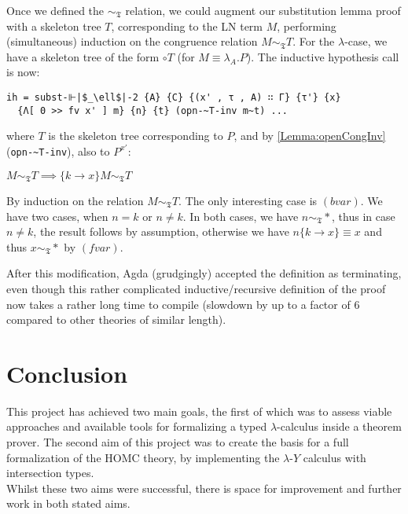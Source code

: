\documentclass[a4paper, 12pt, twoside]{style/ociamthesis}
\makeatletter
\theoremstyle{plain}
\theoremstyle{definition}
\newtheorem{Lemma}{Lemma}[chapter]
\theoremstyle{remark}
\renewenvironment{proof}[1][\proofname]{\par
  \vspace{-\topsep}%
  \pushQED{\qed}%
  \normalfont
  \topsep0pt \partopsep0pt %
  \trivlist
  \item[\hskip\labelsep
        \itshape
    #1\@addpunct{.}]\ignorespaces
}{%
  \popQED\endtrivlist\@endpefalse
  \addvspace{6pt plus 6pt} %
}
\newcommand{\lamy}{\lambda\text{-}Y}
\newcommand{\trel}{\sim_\mathfrak{T}}
\renewenvironment{Lemma}{\begin{OldLemma}\begin{mdframed}[style=example, linecolor=cyan]}{\end{mdframed}\end{OldLemma}}
\makeatother
\begin{document}
Once we defined the \(\trel\) relation, we could augment our
substitution lemma proof with a skeleton tree \(T\), corresponding to
the LN term \(M\), performing (simultaneous) induction on the congruence
relation \(M \trel T\). For the \(\lambda\)-case, we have a skeleton
tree of the form \(\circ T\) (for \(M \equiv \lambda_A.P\)). The
inductive hypothesis call is now:

\begin{verbatim}
ih = subst-⊩|$_\ell$|-2 {A} {C} {(x' , τ , A) ∷ Γ} {τ'} {x} 
  {Λ[ 0 >> fv x' ] m} {n} {t} (opn-~T-inv m~t) ...
\end{verbatim}

where \(T\) is the skeleton tree corresponding to \(P\), and by
\cref{Lemma:openCongInv} (\texttt{opn-\textasciitilde T-inv}), also to
\(P^{x'}\):

\begin{Lemma}

\label{Lemma:openCongInv} \(M \trel T \implies \{k \to x\}M \trel T\)

\begin{proof}

By induction on the relation \(M \trel T\). The only interesting case is
\((bvar)\). We have two cases, when \(n = k\) or \(n \neq k\). In both
cases, we have \(n \trel *\), thus in case \(n \neq k\), the result
follows by assumption, otherwise we have \(n\{k \to x\} \equiv x\) and
thus \(x \trel *\) by \((fvar)\).

\end{proof}

\end{Lemma}

After this modification, Agda (grudgingly) accepted the definition as
terminating, even though this rather complicated inductive/recursive
definition of the proof now takes a rather long time to compile
(slowdown by up to a factor of 6 compared to other theories of similar
length).

\chapter{Conclusion}\label{conclusion}

\label{chap:concl}

This project has achieved two main goals, the first of which was to
assess viable approaches and available tools for formalizing a typed
\(\lambda\)-calculus inside a theorem prover. The second aim of this
project was to create the basis for a full formalization of the HOMC
theory, by implementing the \(\lamy\) calculus with intersection
types.\\
Whilst these two aims were successful, there is space for improvement
and further work in both stated aims.
\end{document}

